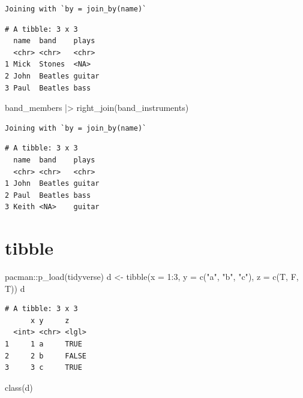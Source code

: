 \documentclass[
  letterpaper,
  DIV=11,
  numbers=noendperiod]{scrreprt}
\newenvironment{Shaded}{\begin{snugshade}}{\end{snugshade}}
\newcommand{\AttributeTok}[1]{\textcolor[rgb]{0.40,0.45,0.13}{#1}}
\newcommand{\DecValTok}[1]{\textcolor[rgb]{0.68,0.00,0.00}{#1}}
\newcommand{\FunctionTok}[1]{\textcolor[rgb]{0.28,0.35,0.67}{#1}}
\newcommand{\NormalTok}[1]{\textcolor[rgb]{0.00,0.23,0.31}{#1}}
\newcommand{\OtherTok}[1]{\textcolor[rgb]{0.00,0.23,0.31}{#1}}
\newcommand{\SpecialCharTok}[1]{\textcolor[rgb]{0.37,0.37,0.37}{#1}}
\newcommand{\StringTok}[1]{\textcolor[rgb]{0.13,0.47,0.30}{#1}}
\begin{document}
\begin{verbatim}
Joining with `by = join_by(name)`
\end{verbatim}

\begin{verbatim}
# A tibble: 3 x 3
  name  band    plays 
  <chr> <chr>   <chr> 
1 Mick  Stones  <NA>  
2 John  Beatles guitar
3 Paul  Beatles bass  
\end{verbatim}

\begin{Shaded}
\begin{Highlighting}[]
\NormalTok{band\_members }\SpecialCharTok{|\textgreater{}} \FunctionTok{right\_join}\NormalTok{(band\_instruments)}
\end{Highlighting}
\end{Shaded}

\begin{verbatim}
Joining with `by = join_by(name)`
\end{verbatim}

\begin{verbatim}
# A tibble: 3 x 3
  name  band    plays 
  <chr> <chr>   <chr> 
1 John  Beatles guitar
2 Paul  Beatles bass  
3 Keith <NA>    guitar
\end{verbatim}

\hypertarget{tibble-1}{%
\section{tibble}\label{tibble-1}}

\begin{Shaded}
\begin{Highlighting}[]
\NormalTok{pacman}\SpecialCharTok{::}\FunctionTok{p\_load}\NormalTok{(tidyverse)}
\NormalTok{d }\OtherTok{\textless{}{-}} \FunctionTok{tibble}\NormalTok{(}\AttributeTok{x =} \DecValTok{1}\SpecialCharTok{:}\DecValTok{3}\NormalTok{, }\AttributeTok{y =} \FunctionTok{c}\NormalTok{(}\StringTok{"a"}\NormalTok{, }\StringTok{"b"}\NormalTok{, }\StringTok{"c"}\NormalTok{), }\AttributeTok{z =} \FunctionTok{c}\NormalTok{(T, F, T))}
\NormalTok{d}
\end{Highlighting}
\end{Shaded}

\begin{verbatim}
# A tibble: 3 x 3
      x y     z    
  <int> <chr> <lgl>
1     1 a     TRUE 
2     2 b     FALSE
3     3 c     TRUE 
\end{verbatim}

\begin{Shaded}
\begin{Highlighting}[]
\FunctionTok{class}\NormalTok{(d)}
\end{Highlighting}
\end{Shaded}
\end{document}
